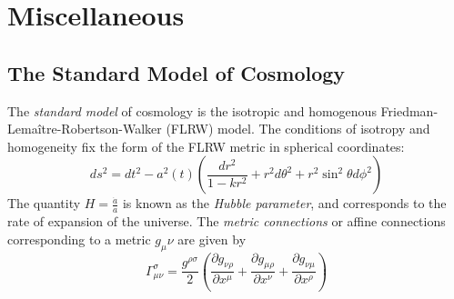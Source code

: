 

\chapter{Miscellaneous}
\section{The Standard Model of Cosmology}\label{sec:sm_cosmology}
The \emph{standard model} of cosmology \citep{Bergstrom2004} is the isotropic and homogenous Friedman-Lema\^itre-Robertson-Walker (FLRW) model. The conditions of isotropy and homogeneity fix the form of the FLRW metric in spherical coordinates:
\begin{equation}
ds^2 = dt^2 - a^2(t)\left(\frac{dr^2}{1-kr^2}+r^2d\theta^2+r^2\sin^2\theta d\phi^2\right)
\end{equation}
The quantity $H = \frac{\dot{a}}{a}$ is known as the \emph{Hubble parameter}, and corresponds to the rate of expansion of the universe.
The \emph{metric connections} or affine connections corresponding to a metric $g_\mu\nu$ are given by
\[\Gamma^\sigma_{\mu\nu} = \frac{g^{\rho\sigma}}{2}\left(\frac{\partial g_{\nu\rho}}{\partial x^\mu}+\frac{\partial g_{\mu\rho}}{\partial x^\nu}+\frac{\partial g_{\nu\mu}}{\partial x^\rho}\right)\]
